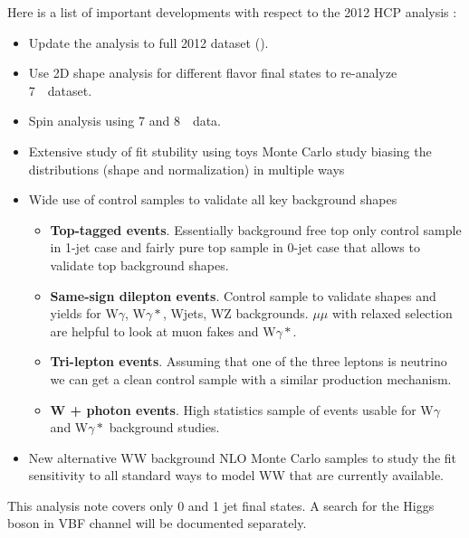 Here is a list of important developments with respect to the 2012 HCP
analysis \cite{HWWHCP2012}:
\begin{itemize}
\item 
Update the analysis to full 2012 dataset (\intlumiEightTeV).
\item 
Use 2D shape analysis for different flavor final states to re-analyze
7~\TeV\ dataset.
\item
Spin analysis using 7 and 8~\TeV\ data.
\item 
Extensive study of fit stubility using toys Monte Carlo study biasing
the distributions (shape and normalization) in multiple ways
\item
Wide use of control samples to validate all key background shapes
\begin{itemize}
  \item {\bf Top-tagged events}. Essentially background free top only
  control sample in 1-jet case and fairly pure top sample in 0-jet
  case that allows to validate top background shapes.  

  \item {\bf Same-sign dilepton events}. Control sample to validate
  shapes and yields for W$\gamma$, W$\gamma*$, Wjets, WZ
  backgrounds. $\mu\mu$ with relaxed selection are helpful to look at
  muon fakes and W$\gamma*$.
  
  \item {\bf Tri-lepton events}. Assuming that one of the three
  leptons is neutrino we can get a clean control sample with a similar
  production mechanism.

  \item {\bf W + photon events}. High statistics sample of events
  usable for W$\gamma$ and W$\gamma*$ background studies.
\end{itemize}
\item 
New alternative WW background NLO Monte Carlo samples to study the fit
sensitivity to all standard ways to model WW that are currently available.
\end{itemize}

This analysis note covers only 0 and 1 jet final states. A search for
the Higgs boson in VBF channel will be documented separately.

